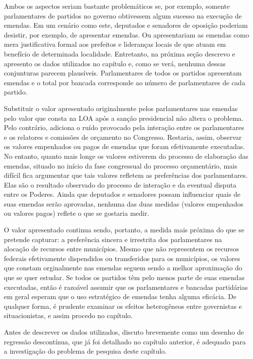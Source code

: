 Ambos os aspectos seriam bastante problemáticos se, por exemplo, somente parlamentares de partidos no governo obtivessem algum sucesso na execução de emendas. Em um cenário como este, deputados e senadores de oposição poderiam desistir, por exemplo, de apresentar emendas. Ou apresentariam as emendas como mera justificativa formal aos prefeitos e lideranças locais de que atuam em benefício de determinada localidade. Entretanto, na próxima seção descrevo e apresento os dados utilizados no capítulo e, como se verá, nenhuma dessas conjunturas parecem plausíveis. Parlamentares de todos os partidos apresentam emendas e o total por bancada corresponde ao número de parlamentares de cada partido.

Substituir o valor apresentado originalmente pelos parlamentares nas emendas pelo valor que consta na LOA após a sanção presidencial não altera o problema. Pelo contrário, adiciona o ruído provocado pela interação entre os parlamentares e os relatores e comissões de orçamento no Congresso. Restaria, assim, observar os valores empenhados ou pagos de emendas que foram efetivamente executadas. No entanto, quanto mais longe os valores estiverem do processo de elaboração das emendas, situado no início da fase congressual do processo orçamentário, mais difícil fica argumentar que tais valores refletem as preferências dos parlamentares. Elas são o resultado observado do processo de interação e da eventual disputa entre os Poderes. Ainda que deputados e senadores possam influenciar quais de suas emendas serão aprovadas, nenhuma das duas medidas (valores empenhados ou valores pagos) reflete o que se gostaria medir.

O valor apresentado continua sendo, portanto, a medida mais próxima do que se pretende capturar: a preferência sincera e irrestrita dos parlamentares na alocação de recursos entre municípios. Mesmo que não representem os recursos federais efetivamente dispendidos ou transferidos para os municípios, os valores que constam orginalmente nas emendas seguem sendo a melhor aproximação do que se quer estudar. Se todos os partidos têm  pelo menos parte de suas emendas executadas, então é razoável assumir que os parlamentares e bancadas partidárias em geral esperam que o uso estratégico de emendas tenha alguma eficácia. De qualquer forma, é prudente examinar os efeitos heterogêneos entre governistas e situacionistas, e assim procedo no capítulo.

Antes de descrever os dados utilizados, discuto brevemente como um desenho de regressão descontínua, que já foi detalhado no capítulo anterior, é adequado para a investigação do problema de pesquisa deste capítulo.

